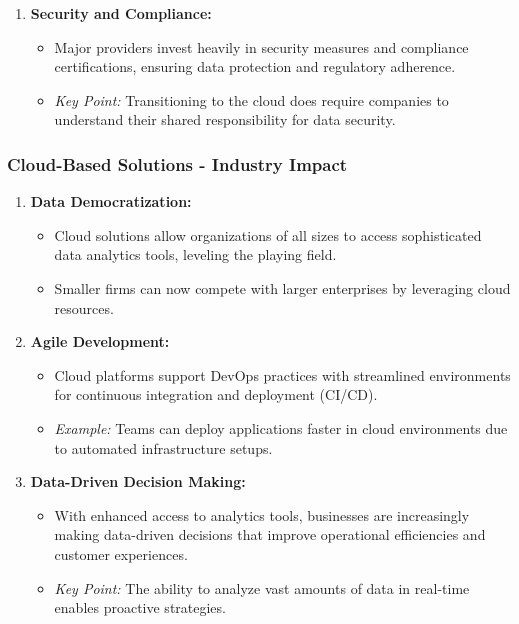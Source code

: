 \documentclass{beamer}
\begin{document}
\begin{frame}[fragile]
\begin{enumerate}
        \item \textbf{Security and Compliance:}
        \begin{itemize}
            \item Major providers invest heavily in security measures and compliance certifications, ensuring data protection and regulatory adherence.
            \item \textit{Key Point:} Transitioning to the cloud does require companies to understand their shared responsibility for data security.
        \end{itemize}
    \end{enumerate}
\end{frame}

\begin{frame}[fragile]
    \frametitle{Cloud-Based Solutions - Industry Impact}
    \begin{enumerate}
        \item \textbf{Data Democratization:}
        \begin{itemize}
            \item Cloud solutions allow organizations of all sizes to access sophisticated data analytics tools, leveling the playing field.
            \item Smaller firms can now compete with larger enterprises by leveraging cloud resources.
        \end{itemize}

        \item \textbf{Agile Development:}
        \begin{itemize}
            \item Cloud platforms support DevOps practices with streamlined environments for continuous integration and deployment (CI/CD).
            \item \textit{Example:} Teams can deploy applications faster in cloud environments due to automated infrastructure setups.
        \end{itemize}

        \item \textbf{Data-Driven Decision Making:}
        \begin{itemize}
            \item With enhanced access to analytics tools, businesses are increasingly making data-driven decisions that improve operational efficiencies and customer experiences.
            \item \textit{Key Point:} The ability to analyze vast amounts of data in real-time enables proactive strategies.
        \end{itemize}
    \end{enumerate}
\end{frame}
\end{document}
